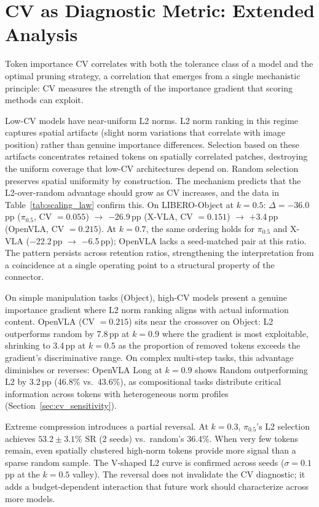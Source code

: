\section{CV as Diagnostic Metric: Extended Analysis}
\label{app:cv_extended}
\label{sec:diagnostic}

Token importance CV correlates with both the tolerance class of a model and the optimal pruning strategy, a correlation that emerges from a single mechanistic principle: CV measures the strength of the importance gradient that scoring methods can exploit.

Low-CV models have near-uniform L2 norms. L2 norm ranking in this regime captures spatial artifacts (slight norm variations that correlate with image position) rather than genuine importance differences. Selection based on these artifacts concentrates retained tokens on spatially correlated patches, destroying the uniform coverage that low-CV architectures depend on. Random selection preserves spatial uniformity by construction. The mechanism predicts that the L2-over-random advantage should grow as CV increases, and the data in Table~\ref{tab:scaling_law} confirm this. On LIBERO-Object at $k{=}0.5$: $\Delta = -$36.0\,pp ($\pi_{0.5}$, CV $= 0.055$) $\to$ $-$26.9\,pp (X-VLA, CV $= 0.151$) $\to$ $+$3.4\,pp (OpenVLA, CV $= 0.215$). At $k{=}0.7$, the same ordering holds for $\pi_{0.5}$ and X-VLA ($-$22.2\,pp $\to$ $-$6.5\,pp); OpenVLA lacks a seed-matched pair at this ratio. The pattern persists across retention ratios, strengthening the interpretation from a coincidence at a single operating point to a structural property of the connector.

On simple manipulation tasks (Object), high-CV models present a genuine importance gradient where L2 norm ranking aligns with actual information content. OpenVLA (CV $= 0.215$) sits near the crossover on Object: L2 outperforms random by 7.8\,pp at $k{=}0.9$ where the gradient is most exploitable, shrinking to 3.4\,pp at $k{=}0.5$ as the proportion of removed tokens exceeds the gradient's discriminative range. On complex multi-step tasks, this advantage diminishes or reverses: OpenVLA Long at $k{=}0.9$ shows Random outperforming L2 by 3.2\,pp (46.8\% vs.\ 43.6\%), as compositional tasks distribute critical information across tokens with heterogeneous norm profiles (Section~\ref{sec:cv_sensitivity}).

Extreme compression introduces a partial reversal. At $k{=}0.3$, $\pi_{0.5}$'s L2 selection achieves $53.2 \pm 3.1$\% SR (2 seeds) vs.\ random's 36.4\%. When very few tokens remain, even spatially clustered high-norm tokens provide more signal than a sparse random sample. The V-shaped L2 curve is confirmed across seeds ($\sigma{=}0.1$\,pp at the $k{=}0.5$ valley). The reversal does not invalidate the CV diagnostic; it adds a budget-dependent interaction that future work should characterize across more models.

